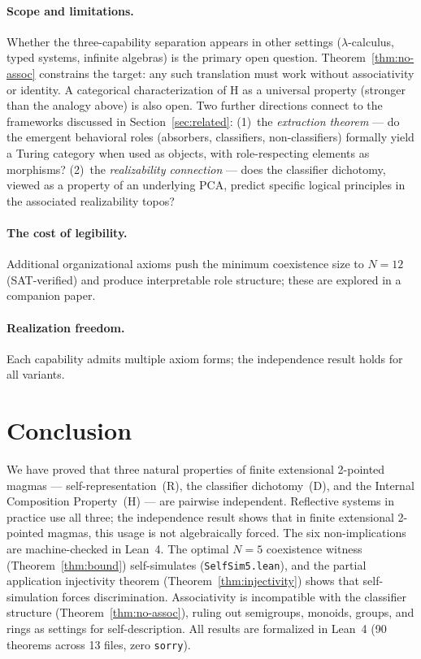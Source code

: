 \documentclass[sigconf,screen]{acmart}
\theoremstyle{remark}
\begin{document}
\paragraph{Scope and limitations.}
Whether the three-capability separation appears in other settings ($\lambda$-calculus, typed systems, infinite algebras) is the primary open question. Theorem~\ref{thm:no-assoc} constrains the target: any such translation must work without associativity or identity. A categorical characterization of H as a universal property (stronger than the analogy above) is also open. Two further directions connect to the frameworks discussed in Section~\ref{sec:related}: (1)~the \emph{extraction theorem} --- do the emergent behavioral roles (absorbers, classifiers, non-classifiers) formally yield a Turing category when used as objects, with role-respecting elements as morphisms? (2)~the \emph{realizability connection} --- does the classifier dichotomy, viewed as a property of an underlying PCA, predict specific logical principles in the associated realizability topos?

\paragraph{The cost of legibility.}
Additional organizational axioms push the minimum coexistence size to $N\!=\!12$ (SAT-verified) and produce interpretable role structure; these are explored in a companion paper.

\paragraph{Realization freedom.}
Each capability admits multiple axiom forms; the independence result holds for all variants.

\section{Conclusion}

We have proved that three natural properties of finite extensional 2-pointed magmas --- self-representation~(R), the classifier dichotomy~(D), and the Internal Composition Property~(H) --- are pairwise independent. Reflective systems in practice use all three; the independence result shows that in finite extensional 2-pointed magmas, this usage is not algebraically forced. The six non-implications are machine-checked in Lean~4. The optimal $N\!=\!5$ coexistence witness (Theorem~\ref{thm:bound}) self-simulates (\texttt{SelfSim5.lean}), and the partial application injectivity theorem (Theorem~\ref{thm:injectivity}) shows that self-simulation forces discrimination. Associativity is incompatible with the classifier structure (Theorem~\ref{thm:no-assoc}), ruling out semigroups, monoids, groups, and rings as settings for self-description. All results are formalized in Lean~4 (90 theorems across 13 files, zero \texttt{sorry}).
\end{document}
